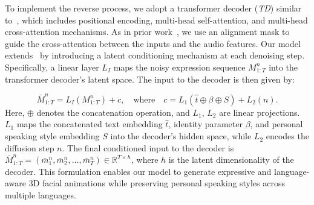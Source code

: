 \documentclass[a4paper, 10pt, conference]{ieeeconf}      %
\begin{document}
To implement the reverse process, we adopt a transformer decoder (\textit{TD}) similar to~\cite{sun2023diffposetalk}, which includes positional encoding, multi-head self-attention, and multi-head cross-attention mechanisms. As in prior work~\cite{Fan_Lin_Saito_Wang_Komura_faceformer_2022, Thambiraja_2023_ICCV_imitator, xing2023codetalker}, we use an alignment mask to guide the cross-attention between the inputs and the audio features.
Our model extends~\cite{sun2023diffposetalk} by introducing a latent conditioning mechanism at each denoising step. Specifically, a linear layer \( L_I \) maps the noisy expression sequence \( M_{1:T}^n \) into the transformer decoder’s latent space. The input to the decoder is then given by:

\begin{equation}
\bar{M}_{1:T}^n = L_I(M_{1:T}^n) + c, \quad \text{where} \quad c = L_1(\hat{t} \oplus \beta \oplus S) + L_2(n).
\end{equation}
Here, \( \oplus \) denotes the concatenation operation, and \( L_1 \), \( L_2 \) are linear projections. \( L_1 \) maps the concatenated text embedding \( \hat{t} \), identity parameter \( \beta \), and personal speaking style embedding \( S \) into the decoder’s hidden space, while \( L_2 \) encodes the diffusion step \( n \). The final conditioned input to the decoder is \( \bar{M}_{1:T}^n = (\bar{m}_1^n, \bar{m}_2^n, \dots, \bar{m}_T^n) \in \mathbb{R}^{T \times h} \), where \( h \) is the latent dimensionality of the decoder.
This formulation enables our model to generate expressive and language-aware 3D facial animations while preserving personal speaking styles across multiple languages.
\end{document}
